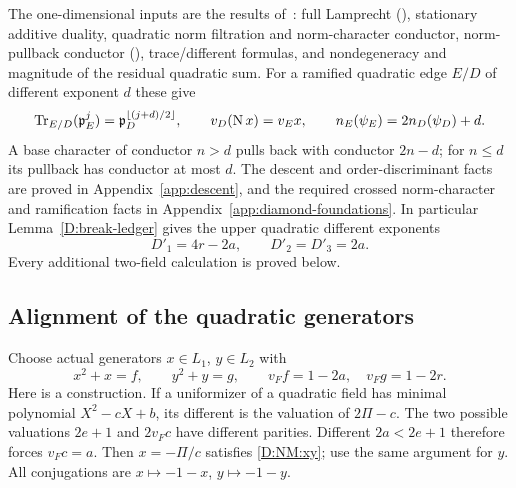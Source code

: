 \documentclass[11pt]{amsart}
\theoremstyle{definition}
\theoremstyle{remark}
\newcommand{\Tr}{\operatorname{Tr}}
\newcommand{\Nm}{\operatorname{N}}
\newcommand{\floor}[1]{\left\lfloor #1\right\rfloor}
\begin{document}
The one-dimensional inputs are the results of~\cite{Ueda}: full Lamprecht
(\cite[Theorem~4.5]{Ueda}), stationary additive duality, quadratic norm
filtration and norm-character conductor, norm-pullback conductor
(\cite[Proposition~3.10]{Ueda}), trace/different formulas, and
nondegeneracy and magnitude of the residual quadratic sum.
For a ramified quadratic edge $E/D$ of different exponent $d$ these give
\begin{equation}\label{D:NM:edge}
 \Tr_{E/D}(\pp_E^j)=\pp_D^{\floor{(j+d)/2}},\qquad
 v_D(\Nm x)=v_Ex,\qquad n_E(\psi_E)=2n_D(\psi_D)+d.
\end{equation}
A base character of conductor $n>d$ pulls back with conductor $2n-d$;
for $n\le d$ its pullback has conductor at most $d$.
The descent and order-discriminant facts are proved in
Appendix~\ref{app:descent}, and the required crossed norm-character and
ramification facts in Appendix~\ref{app:diamond-foundations}.
In particular Lemma~\ref{D:break-ledger} gives the upper
quadratic different exponents
\begin{equation}\label{D:NM:upper}
 D'_1=4r-2a,\qquad D'_2=D'_3=2a.
\end{equation}
Every additional two-field calculation is proved below.

\subsection{Alignment of the quadratic generators}
Choose actual generators $x\in L_1$, $y\in L_2$ with
\begin{equation}\label{D:NM:xy}
 x^2+x=f,\qquad y^2+y=g,\qquad
 v_Ff=1-2a,\quad v_Fg=1-2r.
\end{equation}
Here is a construction. If a uniformizer of a quadratic field has
minimal polynomial $X^2-cX+b$, its different is the valuation of
$2\Pi-c$. The two possible valuations $2e+1$ and $2v_Fc$ have different
parities. Different $2a<2e+1$ therefore forces $v_Fc=a$.
Then $x=-\Pi/c$ satisfies \eqref{D:NM:xy}; use the same argument for $y$.
All conjugations are $x\mapsto-1-x$, $y\mapsto-1-y$.
\end{document}
